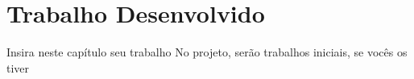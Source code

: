 \chapter{Trabalho Desenvolvido}

Insira neste capítulo seu trabalho
No projeto, serão trabalhos iniciais, se vocês os tiver